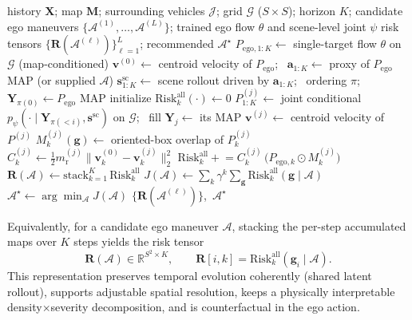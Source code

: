 \documentclass[journal]{IEEEtran}
\begin{document}
\begin{algorithm}[!t]
\caption{World-model-conditioned counterfactual spatial-temporal risk field}
\label{alg:riskfield}
\begin{algorithmic}[1]
\REQUIRE history $\mathbf{X}$; map $\mathbf{M}$; surrounding vehicles $\mathcal{J}$; grid $\mathcal{G}$ ($S{\times}S$); horizon $K$; candidate ego maneuvers $\{\mathcal{A}^{(1)},\dots,\mathcal{A}^{(L)}\}$; trained ego flow $\theta$ and scene-level joint $\psi$
\ENSURE risk tensors $\{\mathbf{R}(\mathcal{A}^{(\ell)})\}_{\ell=1}^{L}$; recommended $\mathcal{A}^{\star}$
  \STATE $P_{\mathrm{ego},1:K}\leftarrow$ single-target flow $\theta$ on $\mathcal{G}$ (map-conditioned)
  \STATE $\mathbf{v}^{(0)}\leftarrow$ centroid velocity of $P_{\mathrm{ego}}$; \ $\mathbf{a}_{1:K}\!\leftarrow$ proxy of $P_{\mathrm{ego}}$ MAP (or supplied $\mathcal{A}$)
  \STATE $\mathbf{s}^{\mathrm{sc}}_{1:K}\leftarrow$ scene rollout driven by $\mathbf{a}_{1:K}$; \ ordering $\pi$; \ $\mathbf{Y}_{\pi(0)}\!\leftarrow P_{\mathrm{ego}}$ MAP
  \STATE initialize $\mathrm{Risk}^{\mathrm{all}}_{k}(\cdot)\!\leftarrow\!0$
    \STATE $P^{(j)}_{1:K}\leftarrow$ joint conditional $p_\psi(\cdot\mid\mathbf{Y}_{\pi(<i)},\mathbf{s}^{\mathrm{sc}})$ on $\mathcal{G}$; \ fill $\mathbf{Y}_j\!\leftarrow$ its MAP
    \STATE $\mathbf{v}^{(j)}\leftarrow$ centroid velocity of $P^{(j)}$
      \STATE $M^{(j)}_k(\mathbf{g})\leftarrow$ oriented-box overlap of $P^{(j)}_k$ 
      \STATE $C^{(j)}_{k}\leftarrow\tfrac12 m^{(j)}_{\mathrm{r}}\lVert\mathbf{v}^{(0)}_{k}-\mathbf{v}^{(j)}_{k}\rVert_2^2$ 
      \STATE $\mathrm{Risk}^{\mathrm{all}}_{k}\mathrel{+}= C^{(j)}_{k}\,\big(P_{\mathrm{ego},k}\odot M^{(j)}_{k}\big)$
    \ENDFOR
  \ENDFOR
  \STATE $\mathbf{R}(\mathcal{A})\leftarrow\mathrm{stack}_{k=1}^{K}\,\mathrm{Risk}^{\mathrm{all}}_{k}$ 
  \STATE $J(\mathcal{A})\leftarrow\sum_{k}\gamma^{k}\sum_{\mathbf{g}}\mathrm{Risk}^{\mathrm{all}}_{k}(\mathbf{g}\mid\mathcal{A})$
\ENDFOR
\STATE $\mathcal{A}^{\star}\leftarrow\arg\min_{\mathcal{A}}J(\mathcal{A})$
\RETURN $\{\mathbf{R}(\mathcal{A}^{(\ell)})\}$,\ $\mathcal{A}^{\star}$
\end{algorithmic}
\end{algorithm}

Equivalently, for a candidate ego maneuver $\mathcal{A}$, stacking the per-step accumulated maps over $K$ steps yields the risk tensor
\begin{equation}
\mathbf{R}(\mathcal{A})\in\mathbb{R}^{S^2\times K},\qquad \mathbf{R}[i,k]=\mathrm{Risk}^{\mathrm{all}}_{k}(\mathbf{g}_i\mid\mathcal{A}).
\label{eq:risk_tensor}
\end{equation}
This representation preserves temporal evolution coherently (shared latent rollout), supports adjustable spatial resolution, keeps a physically interpretable density$\times$severity decomposition, and is counterfactual in the ego action.
\end{document}
